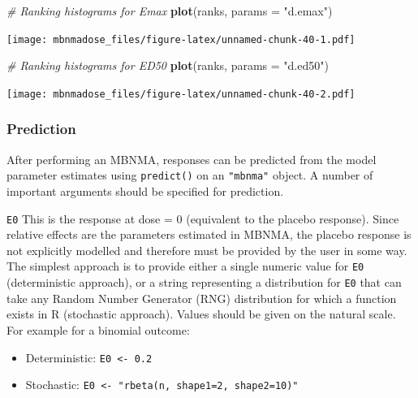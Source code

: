 \documentclass[]{article}
\newenvironment{Shaded}{\begin{snugshade}}{\end{snugshade}}
\newcommand{\CommentTok}[1]{\textcolor[rgb]{0.56,0.35,0.01}{\textit{#1}}}
\newcommand{\DataTypeTok}[1]{\textcolor[rgb]{0.13,0.29,0.53}{#1}}
\newcommand{\KeywordTok}[1]{\textcolor[rgb]{0.13,0.29,0.53}{\textbf{#1}}}
\newcommand{\NormalTok}[1]{#1}
\newcommand{\StringTok}[1]{\textcolor[rgb]{0.31,0.60,0.02}{#1}}
\providecommand{\tightlist}{%
  \setlength{\itemsep}{0pt}\setlength{\parskip}{0pt}}
\begin{document}
\begin{Shaded}
\begin{Highlighting}[]
\CommentTok{# Ranking histograms for Emax}
\KeywordTok{plot}\NormalTok{(ranks, }\DataTypeTok{params =} \StringTok{"d.emax"}\NormalTok{)}
\end{Highlighting}
\end{Shaded}

\texttt{[image: mbnmadose\_files/figure-latex/unnamed-chunk-40-1.pdf]}

\begin{Shaded}
\begin{Highlighting}[]

\CommentTok{# Ranking histograms for ED50}
\KeywordTok{plot}\NormalTok{(ranks, }\DataTypeTok{params =} \StringTok{"d.ed50"}\NormalTok{)}
\end{Highlighting}
\end{Shaded}

\texttt{[image: mbnmadose\_files/figure-latex/unnamed-chunk-40-2.pdf]}

\hypertarget{prediction}{%
\subsubsection{Prediction}\label{prediction}}

After performing an MBNMA, responses can be predicted from the model
parameter estimates using \texttt{predict()} on an \texttt{"mbnma"}
object. A number of important arguments should be specified for
prediction.

\texttt{E0} This is the response at dose = 0 (equivalent to the placebo
response). Since relative effects are the parameters estimated in MBNMA,
the placebo response is not explicitly modelled and therefore must be
provided by the user in some way. The simplest approach is to provide
either a single numeric value for \texttt{E0} (deterministic approach),
or a string representing a distribution for \texttt{E0} that can take
any Random Number Generator (RNG) distribution for which a function
exists in R (stochastic approach). Values should be given on the natural
scale. For example for a binomial outcome:

\begin{itemize}
\tightlist
\item
  Deterministic: \texttt{E0\ \textless{}-\ 0.2}
\item
  Stochastic:
  \texttt{E0\ \textless{}-\ "rbeta(n,\ shape1=2,\ shape2=10)"}
\end{itemize}
\end{document}
